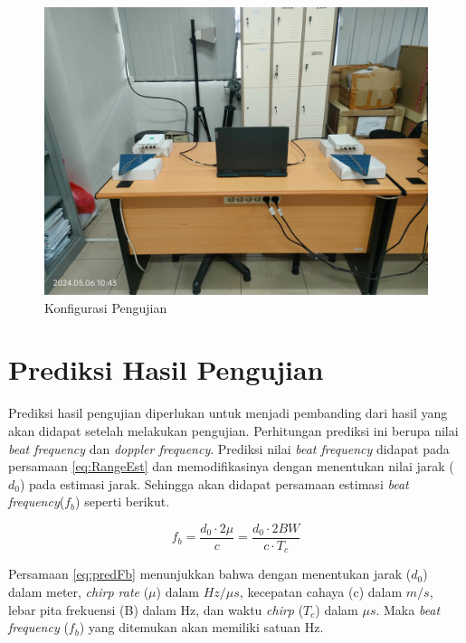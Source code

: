\begin{figure}
	\begin{center}
		\includegraphics[scale=0.09]{pics/bab3/konfigurasiPengujian.jpg}
		\caption{Konfigurasi Pengujian}
		\label{img:konfigurasi}
	\end{center}
\end{figure}


\section{Prediksi Hasil Pengujian}

Prediksi hasil pengujian diperlukan untuk menjadi pembanding dari hasil yang akan didapat setelah melakukan pengujian. Perhitungan prediksi ini berupa nilai \textit{beat frequency} dan \textit{doppler frequency}. Prediksi nilai \textit{beat frequency} didapat pada persamaan \ref{eq:RangeEst} dan memodifikasinya dengan menentukan nilai jarak ($d_{0}$) pada estimasi jarak. Sehingga akan didapat persamaan estimasi \textit{beat frequency}($f_{b}$) seperti berikut.

\begin{equation}
	f_{b} = \frac{d_{0} \cdot 2 \mu}{c} = \frac{d_{0} \cdot 2BW}{c \cdot T_{c}}
	\label{eq:predFb}
\end{equation}

Persamaan \ref{eq:predFb} menunjukkan bahwa dengan menentukan jarak ($d_{0}$) dalam meter, \textit{chirp rate} ($\mu$) dalam $Hz/\mu s$, kecepatan cahaya (c) dalam $m/s$, lebar pita frekuensi (B) dalam Hz, dan waktu \textit{chirp} ($T_{c}$) dalam $\mu s$. Maka \textit{beat frequency} ($f_{b}$) yang ditemukan akan memiliki satuan Hz.


